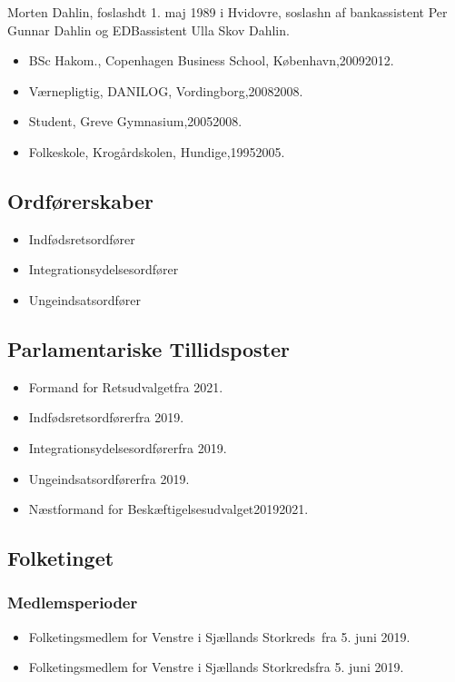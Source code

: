 \documentclass[11pt, a4paper]{awesome-cv}
\begin{document}
\makecvheader[R]
\makelettertitle
\begin{cvletter}
Morten Dahlin, foslashdt 1. maj 1989 i Hvidovre, soslashn af bankassistent Per Gunnar Dahlin og EDBassistent Ulla Skov Dahlin.

\begin{itemize}
\item BSc Hakom., Copenhagen Business School, København,20092012.
\item Værnepligtig, DANILOG, Vordingborg,20082008.
\item Student, Greve Gymnasium,20052008.
\item Folkeskole, Krogårdskolen, Hundige,19952005.
\end{itemize}
\subsection*{Ordførerskaber}
\begin{itemize}
\item Indfødsretsordfører
\item Integrationsydelsesordfører
\item Ungeindsatsordfører
\end{itemize}
\subsection*{Parlamentariske Tillidsposter}
\begin{itemize}
\item Formand for Retsudvalgetfra 2021.
\item Indfødsretsordførerfra 2019.
\item Integrationsydelsesordførerfra 2019.
\item Ungeindsatsordførerfra 2019.
\item Næstformand for Beskæftigelsesudvalget20192021.
\end{itemize}
\subsection*{Folketinget}
\subsubsection*{Medlemsperioder}
\begin{itemize}
\item Folketingsmedlem for Venstre i Sjællands Storkreds fra 5. juni 2019.
\item Folketingsmedlem for Venstre i Sjællands Storkredsfra 5. juni 2019.
\end{itemize}

\end{cvletter}
\end{document}
